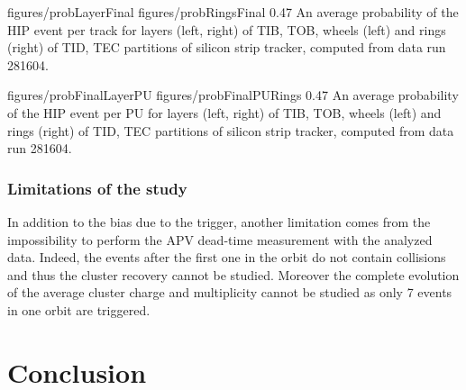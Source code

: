                  {figures/probLayerFinal} %
                 {figures/probRingsFinal} %
                 {0.47}       %
                 {An average probability of the HIP event per track for layers (left, right) of TIB, TOB, wheels (left) and rings (right) of TID, TEC partitions of silicon strip tracker, computed from data run 281604.} 


                 {figures/probFinalLayerPU} %
                 {figures/probFinalPURings} %
                 {0.47}       %
                 {An average probability of the HIP event per PU for layers (left, right) of TIB, TOB, wheels (left) and rings (right) of TID, TEC partitions of silicon strip tracker, computed from data run 281604.} 

\subsubsection{Limitations of the study}
 
In addition to the bias due to the trigger, another limitation comes from the impossibility to perform the APV dead-time measurement with the analyzed data. Indeed, the events after the first one in the orbit do not contain collisions and thus the cluster recovery cannot be studied. Moreover the complete evolution of the average cluster charge and multiplicity cannot be studied as only 7 events in one orbit are triggered. 

\section{Conclusion}

